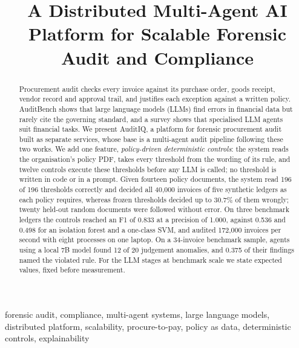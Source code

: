 \documentclass[conference]{IEEEtran}
\begin{document}
\title{A Distributed Multi-Agent AI Platform for Scalable Forensic Audit and Compliance}

\author{
}

\maketitle

\begin{abstract}
Procurement audit checks every invoice against its purchase order, goods receipt, vendor record and approval trail, and justifies each exception against a written policy. AuditBench shows that large language models (LLMs) find errors in financial data but rarely cite the governing standard, and a survey shows that specialised LLM agents suit financial tasks. We present AuditIQ, a platform for forensic procurement audit built as separate services, whose base is a multi-agent audit pipeline following these two works. We add one feature, \emph{policy-driven deterministic controls}: the system reads the organisation's policy PDF, takes every threshold from the wording of its rule, and twelve controls execute these thresholds before any LLM is called; no threshold is written in code or in a prompt. Given fourteen policy documents, the system read 196 of 196 thresholds correctly and decided all 40{,}000 invoices of five synthetic ledgers as each policy requires, whereas frozen thresholds decided up to 30.7\% of them wrongly; twenty held-out random documents were followed without error. On three benchmark ledgers the controls reached an F1 of 0.833 at a precision of 1.000, against 0.536 and 0.498 for an isolation forest and a one-class SVM, and audited 172{,}000 invoices per second with eight processes on one laptop. On a 34-invoice benchmark sample, agents using a local 7B model found 12 of 20 judgement anomalies, and 0.375 of their findings named the violated rule. For the LLM stages at benchmark scale we state expected values, fixed before measurement.
\end{abstract}

\begin{IEEEkeywords}
forensic audit, compliance, multi-agent systems, large language models, distributed platform, scalability, procure-to-pay, policy as data, deterministic controls, explainability
\end{IEEEkeywords}
\end{document}
